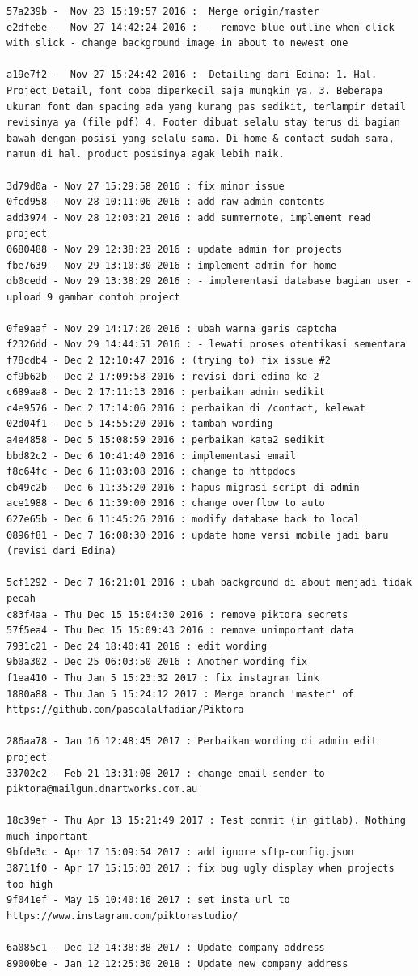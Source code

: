 \begin{lstlisting}[caption={Histori \textit{commit} pada proyek Piktora},label={lst:all_commit_piktora},language=plaintext]
57a239b -  Nov 23 15:19:57 2016 :  Merge origin/master
e2dfebe -  Nov 27 14:42:24 2016 :  - remove blue outline when click with slick - change background image in about to newest one

a19e7f2 -  Nov 27 15:24:42 2016 :  Detailing dari Edina: 1. Hal. Project Detail, font coba diperkecil saja mungkin ya. 3. Beberapa ukuran font dan spacing ada yang kurang pas sedikit, terlampir detail revisinya ya (file pdf) 4. Footer dibuat selalu stay terus di bagian bawah dengan posisi yang selalu sama. Di home & contact sudah sama, namun di hal. product posisinya agak lebih naik.

3d79d0a - Nov 27 15:29:58 2016 : fix minor issue
0fcd958 - Nov 28 10:11:06 2016 : add raw admin contents
add3974 - Nov 28 12:03:21 2016 : add summernote, implement read project
0680488 - Nov 29 12:38:23 2016 : update admin for projects
fbe7639 - Nov 29 13:10:30 2016 : implement admin for home
db0cedd - Nov 29 13:38:29 2016 : - implementasi database bagian user - upload 9 gambar contoh project

0fe9aaf - Nov 29 14:17:20 2016 : ubah warna garis captcha
f2326dd - Nov 29 14:44:51 2016 : - lewati proses otentikasi sementara
f78cdb4 - Dec 2 12:10:47 2016 : (trying to) fix issue #2
ef9b62b - Dec 2 17:09:58 2016 : revisi dari edina ke-2
c689aa8 - Dec 2 17:11:13 2016 : perbaikan admin sedikit
c4e9576 - Dec 2 17:14:06 2016 : perbaikan di /contact, kelewat
02d04f1 - Dec 5 14:55:20 2016 : tambah wording
a4e4858 - Dec 5 15:08:59 2016 : perbaikan kata2 sedikit
bbd82c2 - Dec 6 10:41:40 2016 : implementasi email
f8c64fc - Dec 6 11:03:08 2016 : change to httpdocs
eb49c2b - Dec 6 11:35:20 2016 : hapus migrasi script di admin
ace1988 - Dec 6 11:39:00 2016 : change overflow to auto
627e65b - Dec 6 11:45:26 2016 : modify database back to local
0896f81 - Dec 7 16:08:30 2016 : update home versi mobile jadi baru (revisi dari Edina)

5cf1292 - Dec 7 16:21:01 2016 : ubah background di about menjadi tidak pecah
c83f4aa - Thu Dec 15 15:04:30 2016 : remove piktora secrets
57f5ea4 - Thu Dec 15 15:09:43 2016 : remove unimportant data
7931c21 - Dec 24 18:40:41 2016 : edit wording
9b0a302 - Dec 25 06:03:50 2016 : Another wording fix
f1ea410 - Thu Jan 5 15:23:32 2017 : fix instagram link
1880a88 - Thu Jan 5 15:24:12 2017 : Merge branch 'master' of https://github.com/pascalalfadian/Piktora

286aa78 - Jan 16 12:48:45 2017 : Perbaikan wording di admin edit project
33702c2 - Feb 21 13:31:08 2017 : change email sender to piktora@mailgun.dnartworks.com.au

18c39ef - Thu Apr 13 15:21:49 2017 : Test commit (in gitlab). Nothing much important
9bfde3c - Apr 17 15:09:54 2017 : add ignore sftp-config.json
38711f0 - Apr 17 15:15:03 2017 : fix bug ugly display when projects too high
9f041ef - May 15 10:40:16 2017 : set insta url to https://www.instagram.com/piktorastudio/

6a085c1 - Dec 12 14:38:38 2017 : Update company address
89000be - Jan 12 12:25:30 2018 : Update new company address
\end{lstlisting}


